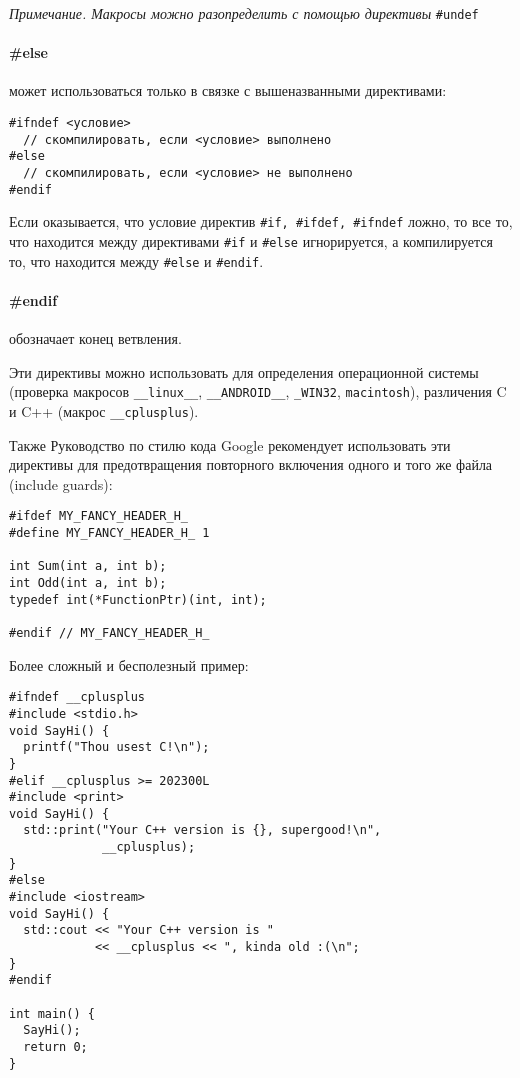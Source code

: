 {\small \textit{Примечание. Макросы можно разопределить с помощью директивы} \verb|#undef| }

\paragraph{\#else} может использоваться только в связке с вышеназванными директивами:
\begin{verbatim}
#ifndef <условие>
  // скомпилировать, если <условие> выполнено
#else
  // скомпилировать, если <условие> не выполнено
#endif
\end{verbatim}

Если оказывается, что условие директив \verb|#if, #ifdef, #ifndef| ложно, то все то, что находится между директивами \verb|#if|
и \verb|#else| игнорируется, а компилируется то, что находится между \verb|#else| и \verb|#endif|.

\paragraph{\#endif} обозначает конец ветвления.

Эти директивы можно использовать для определения операционной системы (проверка макросов \verb|__linux__|, \verb|__ANDROID__|,
\verb|_WIN32|, \verb|macintosh|),
различения C и C++ (макрос \verb|__cplusplus|).

Также Руководство по стилю кода Google рекомендует использовать эти директивы для предотвращения повторного включения одного
и того же файла (include guards):
\begin{verbatim}
#ifdef MY_FANCY_HEADER_H_
#define MY_FANCY_HEADER_H_ 1

int Sum(int a, int b);
int Odd(int a, int b);
typedef int(*FunctionPtr)(int, int);

#endif // MY_FANCY_HEADER_H_
\end{verbatim}

Более сложный и бесполезный пример:
\begin{verbatim}
#ifndef __cplusplus
#include <stdio.h>
void SayHi() {
  printf("Thou usest C!\n");
}
#elif __cplusplus >= 202300L
#include <print>
void SayHi() {
  std::print("Your C++ version is {}, supergood!\n",
             __cplusplus);
}
#else
#include <iostream>
void SayHi() {
  std::cout << "Your C++ version is "
            << __cplusplus << ", kinda old :(\n";
}
#endif

int main() {
  SayHi();
  return 0;
}
\end{verbatim}

